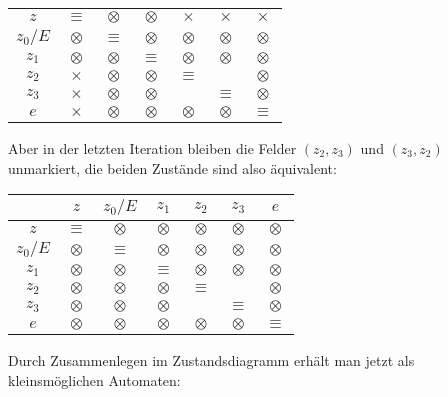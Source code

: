 \begin{loesung}
\begin{center}
\begin{tabular}{|c|cccccc|}
\hline
$z$&$\equiv$&$\otimes$&$\otimes$&$\times$&$\times$&$\times$\\
$z_0/E$&$\otimes$&$\equiv$&$\otimes$&$\otimes$&$\otimes$&$\otimes$\\
$z_1$&$\otimes$&$\otimes$&$\equiv$&$\otimes$&$\otimes$&$\otimes$\\
$z_2$&$\times$&$\otimes$&$\otimes$&$\equiv$&&$\otimes$\\
$z_3$&$\times$&$\otimes$&$\otimes$&&$\equiv$&$\otimes$\\
$e$&$\times$&$\otimes$&$\otimes$&$\otimes$&$\otimes$&$\equiv$\\
\hline
\end{tabular}
\end{center}
Aber in der letzten Iteration bleiben die Felder $(z_2,z_3)$ und
$(z_3,z_2)$ unmarkiert, die beiden Zustände sind also äquivalent:
\begin{center}
\begin{tabular}{|c|cccccc|}
\hline
&$z$&$z_0/E$&$z_1$&$z_2$&$z_3$&$e$\\
\hline
$z$&$\equiv$&$\otimes$&$\otimes$&$\otimes$&$\otimes$&$\otimes$\\
$z_0/E$&$\otimes$&$\equiv$&$\otimes$&$\otimes$&$\otimes$&$\otimes$\\
$z_1$&$\otimes$&$\otimes$&$\equiv$&$\otimes$&$\otimes$&$\otimes$\\
$z_2$&$\otimes$&$\otimes$&$\otimes$&$\equiv$&&$\otimes$\\
$z_3$&$\otimes$&$\otimes$&$\otimes$&&$\equiv$&$\otimes$\\
$e$&$\otimes$&$\otimes$&$\otimes$&$\otimes$&$\otimes$&$\equiv$\\
\hline
\end{tabular}
\end{center}
Durch Zusammenlegen im Zustandsdiagramm erhält man jetzt als
kleinsmöglichen Automaten:
\begin{center}
\end{center}
\end{loesung}
